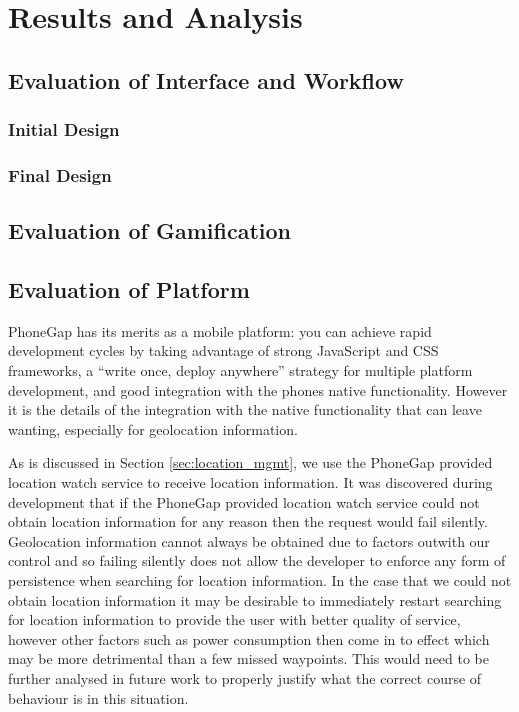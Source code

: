 \chapter{Results and Analysis}\label{ch_results}

\section{Evaluation of Interface and Workflow}
\subsection{Initial Design}

\subsection{Final Design}

\section{Evaluation of Gamification}

\section{Evaluation of Platform}
PhoneGap has its merits as a mobile platform: you can achieve rapid
development cycles by taking advantage of strong JavaScript and CSS
frameworks, a ``write once, deploy anywhere'' strategy for multiple
platform development, and good integration with the phones native
functionality. However it is the details of the integration with the
native functionality that can leave wanting, especially for
geolocation information.

As is discussed in Section \ref{sec:location_mgmt}, we use the PhoneGap
provided location watch service to receive location information. It
was discovered during development that if the PhoneGap provided
location watch service could not obtain location information for any
reason then the request would fail silently. Geolocation information
cannot always be obtained due to factors outwith our control and so
failing silently does not allow the developer to enforce any form of
persistence when searching for location information. In the case that
we could not obtain location information it may be desirable to
immediately restart searching for location information to provide the
user with better quality of service, however other factors such as
power consumption then come in to effect which may be more detrimental
than a few missed waypoints. This would need to be further analysed in
future work to properly justify what the correct course of behaviour
is in this situation.

